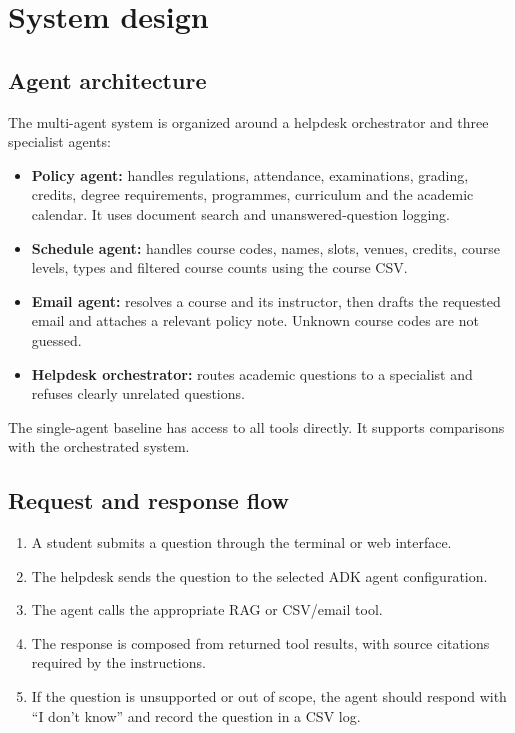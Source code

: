 \documentclass[11pt,a4paper]{article}
\begin{document}
\section{System design}

\subsection{Agent architecture}

The multi-agent system is organized around a helpdesk orchestrator and three specialist agents:
\begin{itemize}
  \item \textbf{Policy agent:} handles regulations, attendance, examinations, grading, credits, degree requirements, programmes, curriculum and the academic calendar. It uses document search and unanswered-question logging.
  \item \textbf{Schedule agent:} handles course codes, names, slots, venues, credits, course levels, types and filtered course counts using the course CSV.
  \item \textbf{Email agent:} resolves a course and its instructor, then drafts the requested email and attaches a relevant policy note. Unknown course codes are not guessed.
  \item \textbf{Helpdesk orchestrator:} routes academic questions to a specialist and refuses clearly unrelated questions.
\end{itemize}

The single-agent baseline has access to all tools directly. It supports comparisons with the orchestrated system.

\subsection{Request and response flow}

\begin{enumerate}
  \item A student submits a question through the terminal or web interface.
  \item The helpdesk sends the question to the selected ADK agent configuration.
  \item The agent calls the appropriate RAG or CSV/email tool.
  \item The response is composed from returned tool results, with source citations required by the instructions.
  \item If the question is unsupported or out of scope, the agent should respond with ``I don't know'' and record the question in a CSV log.
\end{enumerate}
\end{document}
